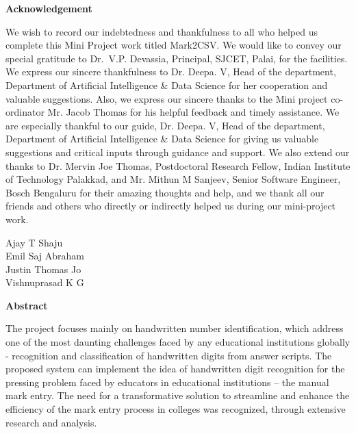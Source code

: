 \newpage
\thispagestyle{empty}
\begin{center}
  \vspace*{1cm}
  \textbf{\large Acknowledgement}
\end{center}
We wish to record our indebtedness and thankfulness to all who helped us complete this Mini Project work titled Mark2CSV. We would like to convey our special gratitude to Dr.~V.P. Devassia, Principal, SJCET, Palai, for the facilities. We express our sincere thankfulness to Dr. Deepa. V, Head of the department, Department of Artificial Intelligence \& Data Science for her cooperation and valuable suggestions. Also, we express our sincere thanks to the Mini project co-ordinator Mr. Jacob Thomas for his helpful feedback and timely assistance.
We are especially thankful to our guide, Dr. Deepa. V, Head of the department, Department of Artificial Intelligence \& Data Science for giving us valuable suggestions and critical inputs through guidance and support. We also extend our thanks to Dr. Mervin Joe Thomas, Postdoctoral Research Fellow, Indian Institute of Technology Palakkad, and Mr. Mithun M Sanjeev, Senior Software Engineer, Bosch Bengaluru for their amazing thoughts and help, and we thank all our friends and others who directly or indirectly helped us during our mini-project work.
 \\
\begin{flushright}
Ajay T Shaju \\
Emil Saj Abraham \\
Justin Thomas Jo \\
Vishnuprasad K G
\end{flushright}

\newpage
\thispagestyle{empty}
\begin{center}
  \textbf{\large Abstract}
\end{center}
The project focuses mainly on handwritten number identification, which address one of the most daunting challenges faced by any educational institutions globally - recognition and classification of handwritten digits from answer scripts. The proposed system can implement the idea of handwritten digit recognition for the pressing problem faced by educators in educational institutions – the manual mark entry. The need for a transformative solution to streamline and enhance the efficiency of the mark entry process in colleges was recognized, through extensive research and analysis.


